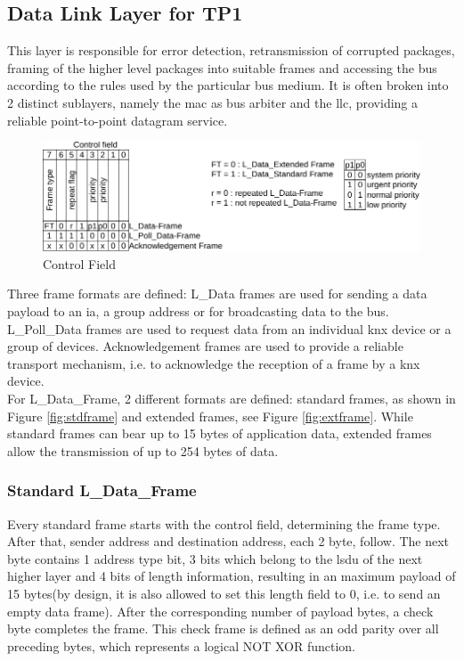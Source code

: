 \subsection{Data Link Layer for TP1}

This layer is responsible for error detection, retransmission of corrupted 
packages, framing of the higher level packages into suitable frames and accessing the bus according to the rules used by the particular bus medium. 
It is often broken into 2 distinct sublayers, namely the \gls{mac} as bus arbiter and the \gls{llc}, providing a reliable point-to-point datagram service.
\begin{figure}
    \centering
    \includegraphics[width=1\textwidth]{figures/ctrl}
    \caption{Control Field}
    \label{fig:ctrlfield}
\end{figure}
Three frame formats are defined: L\_Data frames are used for sending a data payload to an \gls{ia}, a group address or for broadcasting data to
the bus. L\_Poll\_Data frames are used to request data from an individual \gls{knx} device or a group of devices. Acknowledgement frames are used to provide a reliable
transport mechanism, i.e. to acknowledge the reception of a frame by a \gls{knx} device. 
\\
For L\_Data\_Frame, 2 different formats are defined: standard frames, as shown in Figure \ref{fig:stdframe} and extended frames, see Figure \ref{fig:extframe}.
While standard frames can bear up to
15 bytes of application data, extended frames allow the transmission of up to 254 bytes of data.

\subsubsection{Standard L\_Data\_Frame}

Every standard frame starts with the control field, determining the frame type. 
After that, sender address and destination address, each 2 byte, follow.
The next byte contains 1 address type bit, 3 bits which belong to the \gls{lsdu} of the next higher layer
and 4 bits of length information, resulting in an maximum payload of 15 bytes(by design, it is also allowed to set this length
field to 0, i.e. to send an empty data frame). After the corresponding number of payload bytes, a check byte completes the frame. This check
frame is defined as an odd parity over all preceding bytes, which represents a logical NOT XOR function. 

